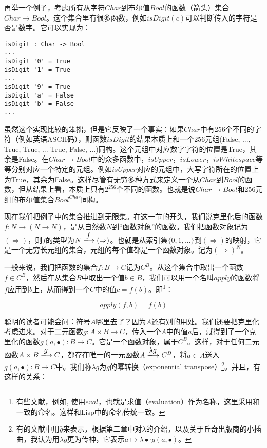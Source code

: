 \documentclass{article}
\begin{document}
\begin{example}
再举一个例子，考虑所有从字符$Char$到布尔值$Bool$的函数（箭头）集合$Char \to Bool$。这个集合里有很多函数，例如$isDigit(c)$可以判断传入的字符是否是数字。它可以实现为：

\lstset{frame=none}
\begin{lstlisting}[style=Haskell]
isDigit : Char -> Bool
...
isDigit '0' = True
isDigit '1' = True
...
isDigit '9' = True
isDigit 'a' = False
isDigit 'b' = False
...
\end{lstlisting}

虽然这个实现比较的笨拙，但是它反映了一个事实：如果$Char$中有256个不同的字符（例如英语ASCII码），则函数$isDigit$的结果本质上和一个256元组(False, ..., True, True, ... True, False, ...)同构。这个元组中对应数字字符的位置是True，其余是False。在$Char \to Bool$中的众多函数中，$isUpper$，$isLower$，$isWhitespace$等等分别对应一个特定的元组。例如$isUpper$对应的元组中，大写字符所在的位置上为True，其余为False。这样尽管有无穷多种方式来定义一个从$Char$到$Bool$的函数，但从结果上看，本质上只有$2^256$个不同的函数。也就是说$Char \to Bool$和256元组的布尔值集合$Bool^{Char}$同构。
\end{example}

现在我们把例子中的集合推进到无限集。在这一节的开头，我们说克里化后的函数$f: N \to (N \to N)$，是从自然数$N$到“函数对象”的函数。我们把函数对象记为$(\Rightarrow)$，则$f$的类型为$N \arrowto{f} (\Rightarrow)$。也就是从索引集$\{0, 1, ...\}$到$(\Rightarrow)$的映射，它是一个无穷长元组的集合，元组的每个值都是一个函数对象。记为$(\Rightarrow)^N$。

一般来说，我们把函数的集合$f : B \to C$记为$C^B$。从这个集合中取出一个函数$f \in C^B$，然后在从集合$B$中取出一个值$b \in B$，我们可以用一个名叫$apply$的函数将$f$应用到$b$上，从而得到一个$C$中的值$c = f(b)$。即\footnote{有些文献，例如\cite{PeterSmith2018}, \cite{Wiki-Exponentials}使用$eval$，也就是求值（evaluation）作为名称，这里采用和\cite{Bird97}一致的命名。这样和Lisp中的命名传统一致。}：

\[
apply(f, b) = f(b)
\]

聪明的读者可能会问：符号$A$哪里去了？因为$A$还有别的用处。我们还要把克里化考虑进来。对于二元函数$g: A \times B \to C$，传入一个$A$中的值$a$后，就得到了一个克里化的函数$g(a, \bullet) : B \to C$。它是一个函数对象，属于$C^B$。这样，对于任何二元函数$A \times B \arrowto{g} C$，都存在唯一的一元函数$A \arrowto{\lambda g} C^B$，将$a \in A$送入$g(a, \bullet) : B \to C$中。我们称$\lambda g$为$g$的幂转换（exponential transpose）\footnote{有的文献中用$\bar{g}$来表示，根据第二章中对$\lambda$的介绍，以及关于丘奇出版商的小插曲，我认为用$\lambda g$更为传神，它表示$a \mapsto \lambda \bullet \cdot g(a, \bullet)$。}。并且，有这样的关系：
\end{document}
